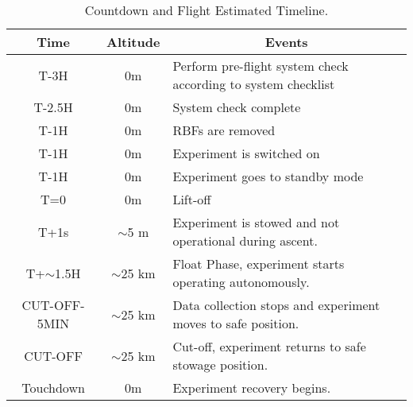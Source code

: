 \begin{table}[H]
\centering


\begin{tabular}{|l|l|l|}
\hline
\multicolumn{1}{|c|}{\textbf{Time}}       & \multicolumn{1}{c|}{\textbf{Altitude}}      & \multicolumn{1}{c|}{\textbf{Events}}                              \\ \hline
\multicolumn{1}{|c|}{T-3H}    & \multicolumn{1}{c|}{0m}             & Perform pre-flight system check according to system checklist                      \\ \hline           
\multicolumn{1}{|c|}{T-2.5H}    & \multicolumn{1}{c|}{0m}             & System check complete                    \\ \hline           
\multicolumn{1}{|c|}{T-1H}    & \multicolumn{1}{c|}{0m}             & RBFs are removed                     \\ \hline           
\multicolumn{1}{|c|}{T-1H}    & \multicolumn{1}{c|}{0m}             & Experiment is switched on                                \\ \hline
\multicolumn{1}{|c|}{T-1H}    & \multicolumn{1}{c|}{0m}             & Experiment goes to standby mode                          \\ \hline
\multicolumn{1}{|c|}{T=0}        & \multicolumn{1}{c|}{0m}             & Lift-off                                              \\ \hline
\multicolumn{1}{|c|}{T+1s}       & \multicolumn{1}{c|}{$\sim$5 m} & Experiment is stowed and not operational during ascent.                  \\ \hline
\multicolumn{1}{|c|}{T+$\sim$1.5H}                     & \multicolumn{1}{c|}{$\sim$25 km}                        & Float Phase, experiment starts operating autonomously.                                           \\ \hline
\multicolumn{1}{|c|}{CUT-OFF-5MIN}                     & \multicolumn{1}{c|}{$\sim$25 km}                        & Data collection stops and experiment moves to safe position.                                                \\ \hline
\multicolumn{1}{|c|}{CUT-OFF}                     & \multicolumn{1}{c|}{$\sim$25 km}                        & Cut-off, experiment returns to safe stowage position.                                                 \\ \hline
\multicolumn{1}{|c|}{Touchdown}                     &  \multicolumn{1}{c|}{0m}                        &  Experiment recovery begins.                \\ \hline
\end{tabular}
\caption{Countdown and Flight Estimated Timeline.}
\label{tab:countflight}
\end{table}

